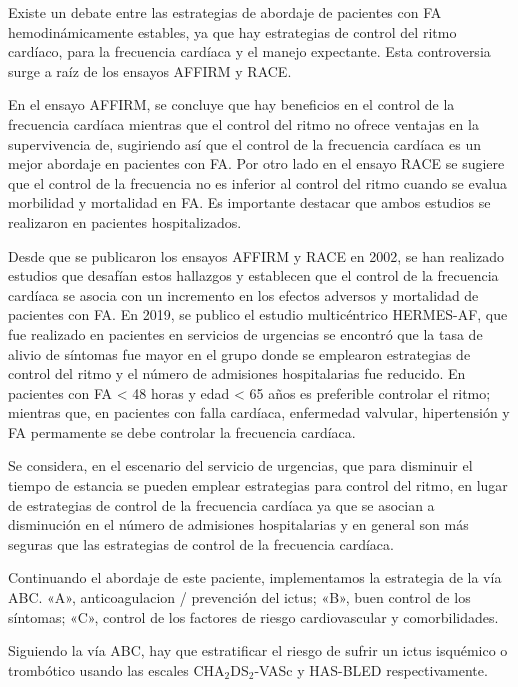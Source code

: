 \documentclass[a4paper]{article}
\let\cite=\supercite
\begin{document}
\begin{multicols}{3}
{Existe un debate entre las estrategias de abordaje de pacientes con FA
hemodinámicamente estables, ya que hay estrategias de control del ritmo
cardíaco, para la frecuencia cardíaca y el manejo expectante. Esta
controversia surge a raíz de los ensayos AFFIRM\cite{AFFIRM} y RACE\cite{RACE}.

En el ensayo AFFIRM, se concluye que hay beneficios en el control de la
frecuencia cardíaca mientras que el control del ritmo no ofrece ventajas en la
supervivencia de, sugiriendo así que el control de la frecuencia cardíaca es un
mejor abordaje en pacientes con FA. Por otro lado en el ensayo RACE se sugiere
que el control de la frecuencia no es inferior al control del ritmo cuando se
evalua morbilidad y mortalidad en FA. Es importante destacar que ambos estudios
se realizaron en pacientes hospitalizados.

Desde que se publicaron los ensayos AFFIRM y RACE en 2002, se han realizado
estudios que desafían estos hallazgos y establecen que el control de la
frecuencia cardíaca se asocia con un incremento en los efectos adversos y
mortalidad de pacientes con FA\cite{malya}. En 2019, se publico el estudio
multicéntrico HERMES-AF, que fue realizado en pacientes en servicios de
urgencias se encontró que la tasa de alivio de síntomas fue mayor en el grupo
donde se emplearon estrategias de control del ritmo y el número de admisiones
hospitalarias fue reducido\cite{HERMESAF}. En pacientes con FA < 48 horas y
edad < 65 años es preferible controlar el ritmo; mientras que, en pacientes con
falla cardíaca, enfermedad valvular, hipertensión y FA permamente se debe
controlar la frecuencia cardíaca\cite{malya}.

Se considera, en el escenario del servicio de urgencias, que para disminuir
el tiempo de estancia se pueden emplear estrategias para control del ritmo,
en lugar de estrategias de control de la frecuencia cardíaca ya que se asocian
a disminución en el número de admisiones hospitalarias y en general son más
seguras que las estrategias de control de la frecuencia cardíaca.

Continuando el abordaje de este paciente, implementamos la estrategia de la vía ABC\cite{lip_abc_2017}. «A», anticoagulacion / prevención del ictus; «B», buen control de los síntomas; «C», control de los factores de riesgo cardiovascular y comorbilidades.

Siguiendo la vía ABC, hay que estratificar el riesgo de sufrir un ictus
isquémico o trombótico usando las escales CHA$_{\text{2}}$DS$_{\text{2}}$-VASc
y HAS-BLED respectivamente.

}
\end{multicols}
\end{document}
